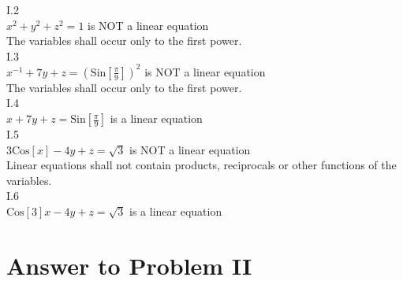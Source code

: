 \documentclass[11pt,a4paper]{article}
\begin{document}
I.2\\
\(x^2+y^2+z^2=1\) is NOT a linear equation\\
The variables shall occur only to the first power.\\

I.3\\
\(x^{-1}+7y+z=\)\(\left(\text{Sin}\left[\frac{\pi }{9}\right]\right)^2\) is NOT a linear equation\\
The variables shall occur only to the first power.\\

I.4\\
\(x+7y+z=\text{Sin}\left[\frac{\pi }{9}\right]\) is a linear equation\\

I.5\\
\(3\text{Cos}[x]-4y+z=\sqrt{3}\) is NOT a linear equation\\
Linear equations shall not contain products, reciprocals or other functions of the variables.\\

I.6\\
\(\text{Cos}[3]x-4y+z=\sqrt{3}\) is a linear equation

\clearpage
\section{Answer to Problem II}\label{sec:P02}
\end{document}
